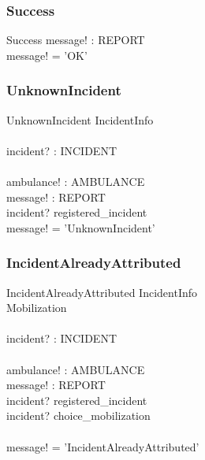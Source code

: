 \documentclass[12pt]{article}
\begin{document}
\subsubsection{Success}

\begin{schema}{Success}
	message! : REPORT	\\
  \where				
	message! = 'OK'		\\
\end{schema}

\subsubsection{UnknownIncident}

\begin{schema}{UnknownIncident}
	\Xi IncidentInfo		\\
	\newline				\\
	incident? : INCIDENT	\\
	\newline				\\
	ambulance! : AMBULANCE	\\
	message! : REPORT		\\
  \where  
	incident? \notin registered\_incident \\
	message! = 'UnknownIncident'
\end{schema}

\subsubsection{IncidentAlreadyAttributed}

\begin{schema}{IncidentAlreadyAttributed}
	\Xi IncidentInfo		\\
	\Xi Mobilization		\\
	\newline				\\
	incident? : INCIDENT	\\
	\newline				\\
	ambulance! : AMBULANCE	\\
	message! : REPORT		\\
  \where
  	incident? \in registered\_incident \\
  	incident? \in \ran choice\_mobilization \\
  	\newline \\
  	message! = 'IncidentAlreadyAttributed'
\end{schema}
\end{document}
